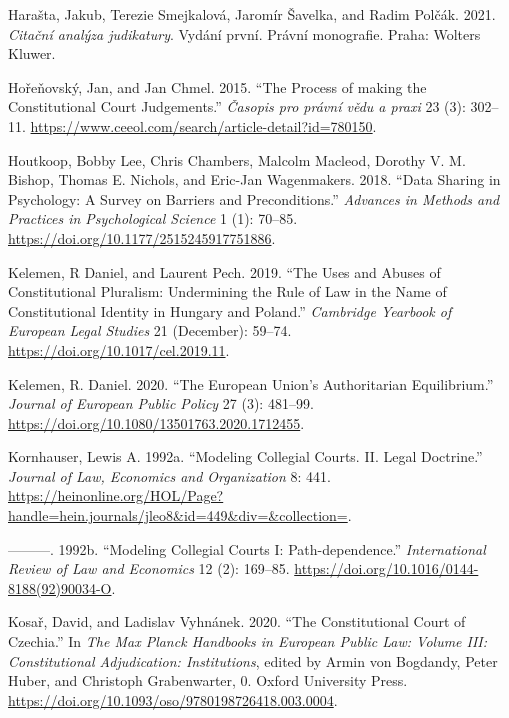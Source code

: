 \documentclass[
  11pt,
]{article}
\newlength{\cslhangindent}
\newenvironment{CSLReferences}[2] %
 {%
  \setlength{\parindent}{0pt}
  \ifodd #1 \everypar{\setlength{\hangindent}{\cslhangindent}}\ignorespaces\fi
  \ifnum #2 > 0
  \setlength{\parskip}{#2\baselineskip}
  \fi
 }%
 {}
\begin{document}
\begin{CSLReferences}{1}{0}
\leavevmode{}%
Harašta, Jakub, Terezie Smejkalová, Jaromír Šavelka, and Radim Polčák.
2021. \emph{Citační analýza judikatury}. Vydání první. Právní
monografie. {Praha}: {Wolters Kluwer}.

\leavevmode{}%
Hořeňovský, Jan, and Jan Chmel. 2015. {``The Process of making the
Constitutional Court Judgements.''} \emph{Časopis pro právní vědu a
praxi} 23 (3): 302--11.
\url{https://www.ceeol.com/search/article-detail?id=780150}.

\leavevmode{}%
Houtkoop, Bobby Lee, Chris Chambers, Malcolm Macleod, Dorothy V. M.
Bishop, Thomas E. Nichols, and Eric-Jan Wagenmakers. 2018. {``Data
{Sharing} in {Psychology}: {A Survey} on {Barriers} and
{Preconditions}.''} \emph{Advances in Methods and Practices in
Psychological Science} 1 (1): 70--85.
\url{https://doi.org/10.1177/2515245917751886}.

\leavevmode{}%
Kelemen, R Daniel, and Laurent Pech. 2019. {``The {Uses} and {Abuses} of
{Constitutional Pluralism}: {Undermining} the {Rule} of {Law} in the
{Name} of {Constitutional Identity} in {Hungary} and {Poland}.''}
\emph{Cambridge Yearbook of European Legal Studies} 21 (December):
59--74. \url{https://doi.org/10.1017/cel.2019.11}.

\leavevmode{}%
Kelemen, R. Daniel. 2020. {``The {European Union}'s Authoritarian
Equilibrium.''} \emph{Journal of European Public Policy} 27 (3):
481--99. \url{https://doi.org/10.1080/13501763.2020.1712455}.

\leavevmode{}%
Kornhauser, Lewis A. 1992a. {``Modeling {Collegial Courts}. {II}. {Legal
Doctrine}.''} \emph{Journal of Law, Economics and Organization} 8: 441.
\url{https://heinonline.org/HOL/Page?handle=hein.journals/jleo8&id=449&div=&collection=}.

\leavevmode{}%
---------. 1992b. {``Modeling Collegial Courts {I}:
{Path-dependence}.''} \emph{International Review of Law and Economics}
12 (2): 169--85. \url{https://doi.org/10.1016/0144-8188(92)90034-O}.

\leavevmode{}%
Kosař, David, and Ladislav Vyhnánek. 2020. {``The {Constitutional Court}
of {Czechia}.''} In \emph{The {Max Planck Handbooks} in {European Public
Law}: {Volume III}: {Constitutional Adjudication}: {Institutions}},
edited by Armin von Bogdandy, Peter Huber, and Christoph Grabenwarter,
0. {Oxford University Press}.
\url{https://doi.org/10.1093/oso/9780198726418.003.0004}.


\end{CSLReferences}
\end{document}

